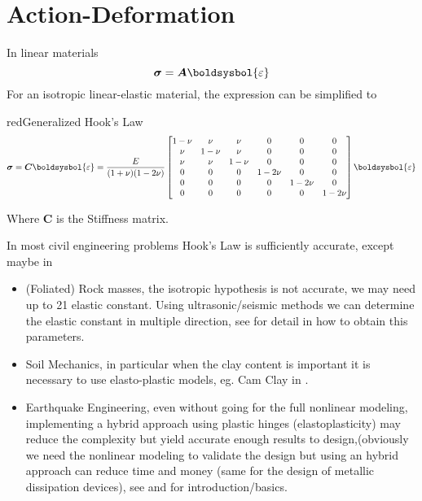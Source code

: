 \documentclass[a4paper, 11pt,article,oneside]{memoir}%
\begin{document}
\section{Action-Deformation}
In linear materials   
\begin{equation*}\label{HookLaw}
\boldsymbol{\sigma}=\boldsymbol{A}\boldsysbol{\varepsilon}
\end{equation*}
For an isotropic linear-elastic material, the expression can be simplified to

\begin{eqbox2}{red}{Generalized Hook's Law}\
\begin{equation*}
\boldsymbol{\sigma}=\boldsymbol{C}\boldsysbol{\varepsilon}=\frac{E}{(1+\nu)(1-2\nu)}
\begin{bmatrix}
1-\nu&\nu&\nu&0&0&0\\
\nu&1-\nu&\nu&0&0&0\\
\nu&\nu&1-\nu&0&0&0\\
0&0&0&1-2\nu&0&0\\
0&0&0&0&1-2\nu&0\\
0&0&0&0&0&1-2\nu\\
\end{bmatrix}\boldsysbol{\varepsilon}
\end{equation*}
\end{eqbox2}
Where $\boldsymbol{C}$ is the Stiffness matrix.
\begin{note}
In most civil engineering  problems Hook's Law is sufficiently accurate, except  maybe in 
\begin{itemize}
\item (Foliated) Rock masses, the isotropic hypothesis is not accurate, we may need up to 21 elastic constant. Using ultrasonic/seismic methods we can determine the elastic constant in multiple direction, see \cite{CIVIL448} for detail in how to obtain this parameters.
\item Soil Mechanics, in particular when the clay content is important it is necessary to use elasto-plastic models, eg. Cam Clay in \cite{ICE2614}.
\item Earthquake Engineering, even without going for the full nonlinear modeling, implementing a hybrid approach using plastic hinges (elastoplasticity) may reduce the complexity but yield accurate enough results to design,(obviously we need the nonlinear modeling to validate the design but using an hybrid approach can reduce time and money (same for the design of metallic dissipation devices), see\cite{CIVIL467} and \cite{ICE3753} for introduction/basics.
\end{itemize}
\end{note}
\end{document}

